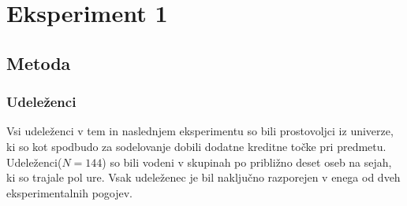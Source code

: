 \documentclass[12pt,a4paper]{amsart}
\theoremstyle{definition} %
\theoremstyle{plain} %
\begin{document}
\section{Eksperiment 1}
\subsection{Metoda}
\subsubsection{Udeleženci}
Vsi udeleženci v tem in naslednjem eksperimentu so bili prostovoljci iz univerze, ki so kot spodbudo za sodelovanje dobili dodatne kreditne točke 
pri predmetu. Udeleženci($N = 144$) so bili vodeni v skupinah po približno deset oseb na sejah, ki so trajale pol ure. Vsak udeleženec je bil 
naključno razporejen v enega od dveh eksperimentalnih pogojev.
\end{document}
